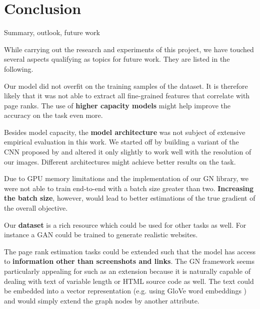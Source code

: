 \section{Conclusion}

Summary, outlook, future work

While carrying out the research and experiments of this project, we have touched several aspects qualifying as topics for future work. They are listed in the following.

Our model did not overfit on the training samples of the dataset. It is therefore likely that it was not able to extract all fine-grained features that correlate with page ranks. The use of \textbf{higher capacity models} might help improve the accuracy on the task even more.

Besides model capacity, the \textbf{model architecture} was not subject of extensive empirical evaluation in this work. We started off by building a variant of the CNN proposed by \cite{beltramelli:pix2code} and altered it only slightly to work well with the resolution of our images. Different architectures might achieve better results on the task.

Due to GPU memory limitations and the implementation of our GN library, we were not able to train end-to-end with a batch size greater than two. \textbf{Increasing the batch size}, however, would lead to better estimations of the true gradient of the overall objective.

Our \textbf{dataset} is a rich resource which could be used for other tasks as well. For instance a GAN \cite{goodfellow2014generative} could be trained to generate realistic websites.

The page rank estimation tasks could be extended such that the model has access to \textbf{information other than screenshots and links}. The GN framework seems particularly appealing for such as an extension because it is naturally capable of dealing with text of variable length or HTML source code as well. The text could be embedded into a vector representation (e.g. using GloVe word embeddings \cite{pennington2014:glove}) and would simply extend the graph nodes by another attribute.
